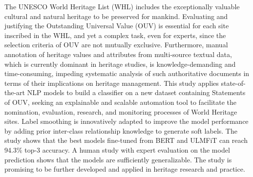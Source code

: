 The UNESCO World Heritage List (WHL) includes the exceptionally valuable cultural and natural heritage to be preserved for mankind. Evaluating and justifying the Outstanding Universal Value (OUV) is essential for each site inscribed in the WHL, and yet a complex task, even for experts, since the selection criteria of OUV are not mutually exclusive. Furthermore, manual annotation of heritage values and attributes from multi-source textual data, which is currently dominant in heritage studies, is knowledge-demanding and time-consuming, impeding systematic analysis of such authoritative documents in terms of their implications on heritage management. This study applies state-of-the-art NLP models to build a classifier on a new dataset containing Statements of OUV, seeking an explainable and scalable automation tool to facilitate the nomination, evaluation, research, and monitoring processes of World Heritage sites. Label smoothing is innovatively adapted to improve the model performance by adding prior inter-class relationship knowledge to generate soft labels. The study shows that the best models fine-tuned from BERT and ULMFiT can reach 94.3\% top-3 accuracy. A human study with expert evaluation on the model prediction shows that the models are sufficiently generalizable. The study is promising to be further developed and applied in heritage research and practice.
